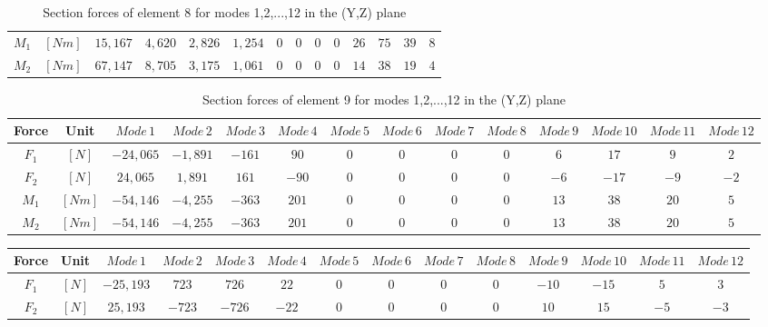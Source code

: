 \documentclass[11pt,a4paper,titlepage]{report}
\begin{document}
\begin{appendix}
\begin{landscape}
\begin{table}[]
\begin{tiny}
\begin{tabular}{c|c|c|c|c|c|c|c|c|c|c|c|c|c}
    $M_1$ & $[Nm]$ & $ 15,167$ & $ 4,620$ & $2,826$ & $1,254$ & $0$ & $0$ & $0$ & $0$ & $26$ & $75$ & $39$ &  $8$\\
    $M_2$ & $[Nm]$ & $ 67,147$ &  $8,705$ &  $3,175$ &  $1,061$ & $0$ & $0$ & $0$ & $0$ & $14$ & $38$ & $ 19$ & $4$\\
        \end{tabular}
        \end{tiny}
    \caption{Section forces of element 8 for modes 1,2,...,12 in the (Y,Z) plane}
    \label{tab:my_label}
\end{table}
\begin{table}[]
    \centering
    \begin{tiny}
    \begin{tabular}{c|c|c|c|c|c|c|c|c|c|c|c|c|c}
    Force & Unit & $Mode\,1$ & $Mode\,2$ & $Mode\,3$ & $Mode\,4$ & $Mode\,5$ & $Mode\,6$ & $Mode\,7$ & $Mode\,8$ & $Mode\,9$ & $Mode\,10$ & $Mode\,11$ & $Mode\,12$\\
    \hline
   $F_1$ & $[N]$ & $-24,065$ & $-1,891$ & $-161$ & $90 $ & $0$ & $0$ & $0$ & $0$ & $6$ & $17$ & $9$ &  $2$\\
   $F_2$ & $[N]$ & $24,065$ & $1,891$ & $161$ & $-90 $ & $0$ & $0$ & $0$ & $0$ & $-6$ & $-17$ & $-9$ &  $-2$\\
    $M_1$ & $[Nm]$ & $-54,146$ & $-4,255$ & $-363$ & $201$ & $0$ & $0$ & $0$ & $0$ & $13$ & $38$ & $20$ &  $5$\\
    $M_2$ & $[Nm]$ & $-54,146$ & $-4,255$ & $-363$ & $201$ & $0$ & $0$ & $0$ & $0$ & $13$ & $38$ & $20$ &  $5$\\
        \end{tabular}
        \end{tiny}
    \caption{Section forces of element 9 for modes 1,2,...,12 in the (Y,Z) plane}
    \label{tab:my_label}
\end{table}
\begin{table}[]
    \centering
    \begin{tiny}
    \begin{tabular}{c|c|c|c|c|c|c|c|c|c|c|c|c|c}
    Force & Unit & $Mode\,1$ & $Mode\,2$ & $Mode\,3$ & $Mode\,4$ & $Mode\,5$ & $Mode\,6$ & $Mode\,7$ & $Mode\,8$ & $Mode\,9$ & $Mode\,10$ & $Mode\,11$ & $Mode\,12$\\
    \hline
   $F_1$ & $[N]$ & $-25,193$ & $723$ & $726$ & $22$ & $0$ & $0$ & $0$ & $0$ & $-10$ & $-15$ & $5$ &  $3$\\
   $F_2$ & $[N]$ & $25,193$ & $-723$ & $-726$ & $-22$ & $0$ & $0$ & $0$ & $0$ & $10$ & $15$ & $-5$ &  $-3$\\

\end{tabular}
\end{tiny}
\end{table}
\end{landscape}
\end{appendix}
\end{document}
